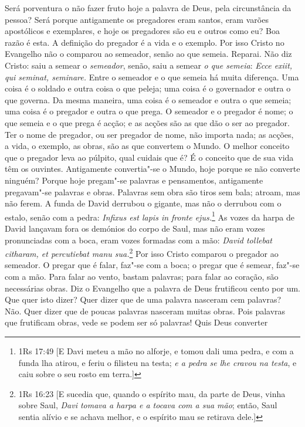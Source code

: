Será porventura o não fazer fruto hoje a palavra de Deus, pela
circunstância da pessoa? Será porque antigamente os pregadores eram
santos, eram varões apostólicos e exemplares, e hoje os pregadores são
eu e outros como eu? Boa razão é esta. A definição do pregador é a
vida e o exemplo. Por isso Cristo no Evangelho não o comparou ao
semeador, senão ao que semeia. Reparai. Não diz Cristo: saiu a semear o
\emph{semeador}, senão, saiu a semear \emph{o que semeia}: \emph{Ecce
exiit, qui seminat, seminare.} Entre o semeador e o que semeia há muita
diferença. Uma coisa é o soldado e outra coisa o que peleja; uma coisa é
o governador e outra o que governa. Da mesma maneira, uma coisa é o
semeador e outra o que semeia; uma coisa é o pregador e outra o que
prega. O semeador e o pregador é nome; o que semeia e o que prega é
acção; e as acções são as que dão o ser ao pregador. Ter o nome de
pregador, ou ser pregador de nome, não importa nada; as acções, a vida,
o exemplo, as obras, são as que convertem o Mundo. O melhor conceito
que o pregador leva ao púlpito, qual cuidais que é? É o conceito que
de sua vida têm os ouvintes.
Antigamente convertia"-se o Mundo, hoje porque se não converte ninguém? Porque hoje pregam"-se palavras e pensamentos, antigamente
pregavam"-se palavras e obras. Palavras sem obra são tiros sem bala;
atroam, mas não ferem. A funda de David derrubou o gigante, mas não o
derrubou com o estalo, senão com a pedra: \emph{Infixus est lapis in
fronte ejus.}\footnote{1Rs 17:49 [E Davi meteu a mão no alforje, e tomou dali uma pedra, e com a funda lha atirou, e feriu o filisteu na testa; \textit{e a pedra se lhe cravou na testa}, e caiu sobre o seu rosto em terra.]} As vozes da harpa de David lançavam
fora os demónios do corpo de Saul, mas não eram vozes pronunciadas com a
boca, eram vozes formadas com a mão: \emph{David tollebat citharam, et
percutiebat manu sua.}\footnote{1Rs 16:23 [E sucedia que, quando o espírito mau, da parte de Deus, vinha sobre Saul, \textit{Davi tomava a harpa e a tocava com a sua mão}; então, Saul sentia alívio e se achava melhor, e o espírito mau se retirava dele.]} Por isso Cristo comparou o
pregador ao semeador. O pregar que é falar, faz"-se com a boca; o pregar
que é semear, faz"-se com a mão. Para falar
ao vento, bastam palavras; para falar ao coração, são necessárias obras.
Diz o Evangelho que a palavra de Deus frutificou cento por um. Que quer
isto dizer? Quer dizer que de uma palavra nasceram cem palavras? Não.
Quer dizer que de poucas palavras nasceram muitas obras. Pois palavras
que frutificam obras, vede se podem ser só palavras! Quis Deus converter
